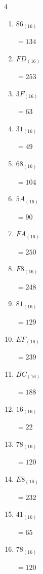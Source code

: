 \begin{multicols}{4}
\begin{enumerate}
        $=68$

  \item $86_{(16)}$

        $=134$

  \item $FD_{(16)}$

        $=253$

  \item $3F_{(16)}$

        $=63$

  \item $31_{(16)}$

        $=49$

  \item $68_{(16)}$

        $=104$

  \item $5A_{(16)}$

        $=90$

  \item $FA_{(16)}$

        $=250$

\columnbreak %

  \item $F8_{(16)}$

        $=248$

  \item $81_{(16)}$

        $=129$

  \item $EF_{(16)}$

        $=239$

  \item $BC_{(16)}$

        $=188$

  \item $16_{(16)}$

        $=22$

  \item $78_{(16)}$

        $=120$

  \item $E8_{(16)}$

        $=232$

  \item $41_{(16)}$

        $=65$

  \item $78_{(16)}$

        $=120$


\end{enumerate}
\end{multicols}

